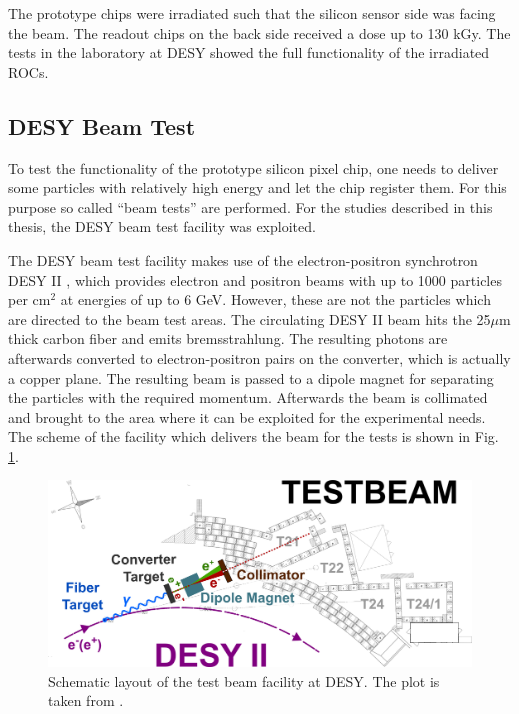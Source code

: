 The prototype chips were irradiated such that the silicon sensor side was facing the beam. The readout chips on the back side received a dose
up to 130 kGy. The tests  in the laboratory at DESY \cite{DESYWeb} showed the full functionality of the irradiated ROCs.

\subsection{DESY Beam Test}

To test the functionality of the prototype silicon pixel chip, one needs to deliver some particles with relatively high energy and let
the chip register them. For this purpose so called ``beam tests'' are performed. For the studies described in this thesis, the DESY beam test
facility was exploited.

The DESY beam test facility makes use of the electron-positron synchrotron DESY II \cite{Hemmie:1982xq, DESYIIWeb}, which provides electron
and positron beams with up to 1000 particles per cm$^{2}$ at energies of up to 6 GeV. However, these are not the particles which are directed
to the beam test areas. The circulating DESY II beam hits the 25$\mu$m thick carbon fiber and emits bremsstrahlung. The resulting photons are afterwards 
converted to electron-positron pairs on the converter, which is actually a copper plane. The resulting beam is passed to a dipole magnet for
separating the particles with the required momentum. Afterwards the beam is collimated and brought to the area where it can be exploited for the
experimental needs. The scheme of the facility which delivers the beam for the tests is shown in Fig. \ref{fig:desy_tb}.

\begin{figure}[t]
 \centering
 \includegraphics[width=1.0\textwidth]{021_pixel_upgrade/plots/desy_tb-sketch.png}
 \caption{Schematic layout of the test beam facility at DESY. The plot is taken from \cite{DESYTBArea}.}
 \label{fig:desy_tb}
\end{figure}

